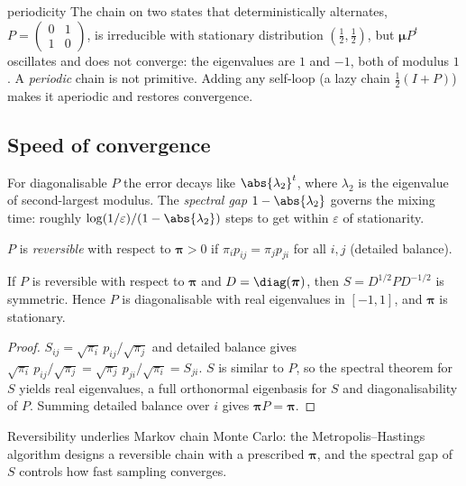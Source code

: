 \begin{nuance}{periodicity}
The chain on two states that deterministically alternates, $P=\begin{pmatrix}0&1\\1&0\end{pmatrix}$, is irreducible with stationary distribution $(\tfrac12,\tfrac12)$, but $\boldsymbol\mu P^t$ oscillates and does not converge: the eigenvalues are $1$ and $-1$, both of modulus $1$. A \emph{periodic} chain is not primitive. Adding any self-loop (a lazy chain $\tfrac12(I+P)$) makes it aperiodic and restores convergence.
\end{nuance}

\subsection*{Speed of convergence}

For diagonalisable $P$ the error decays like $\abs{\lambda_2}^t$, where $\lambda_2$ is the eigenvalue of second-largest modulus. The \emph{spectral gap} $1-\abs{\lambda_2}$ governs the mixing time: roughly $\log(1/\varepsilon)/(1-\abs{\lambda_2})$ steps to get within $\varepsilon$ of stationarity.

\begin{definition}[Reversibility]
$P$ is \emph{reversible} with respect to $\boldsymbol\pi>0$ if $\pi_ip_{ij}=\pi_jp_{ji}$ for all $i,j$ (detailed balance).
\end{definition}

\begin{theorem}\label{thm:reversible}
If $P$ is reversible with respect to $\boldsymbol\pi$ and $D=\diag(\boldsymbol\pi)$, then $S=D^{1/2}PD^{-1/2}$ is symmetric. Hence $P$ is diagonalisable with real eigenvalues in $[-1,1]$, and $\boldsymbol\pi$ is stationary.
\end{theorem}

\begin{proof}
$S_{ij}=\sqrt{\pi_i}\,p_{ij}/\sqrt{\pi_j}$ and detailed balance gives $\sqrt{\pi_i}\,p_{ij}/\sqrt{\pi_j}=\sqrt{\pi_j}\,p_{ji}/\sqrt{\pi_i}=S_{ji}$. $S$ is similar to $P$, so the spectral theorem for $S$ yields real eigenvalues, a full orthonormal eigenbasis for $S$ and diagonalisability of $P$. Summing detailed balance over $i$ gives $\boldsymbol\pi P=\boldsymbol\pi$.
\end{proof}

Reversibility underlies Markov chain Monte Carlo: the Metropolis--Hastings algorithm designs a reversible chain with a prescribed $\boldsymbol\pi$, and the spectral gap of $S$ controls how fast sampling converges.

